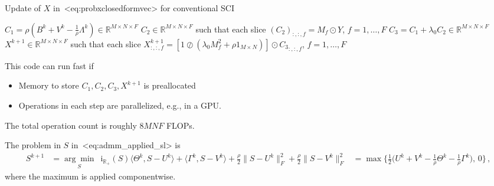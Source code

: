 \documentclass[a4paper,11pt]{article}
\def\\{}%
\def\eqref#1{<#1>}%
\newcommand{\mypar}[1]{\bigskip\noindent {\bf #1.}}
\begin{document}
\begin{algorithm}
  \caption{Update of $X$ in~\eqref{eq:probxclosedformvec} for
  conventional SCI}
  \label{alg:updateX}
  \begin{algorithmic}[1]
    \State $C_1 = \rho (B^k + V^k - \frac{1}{\rho}\Lambda^k) \in \mathbb{R}^{M\times N\times F}$
    \State $C_2 \in \mathbb{R}^{M\times N\times F}$ such that each slice
    $(C_2)_{:, :, f} = M_f \odot Y$, $f = 1, \ldots, F$
    \State $C_3 = C_1 + \lambda_0 C_2 \in \mathbb{R}^{M \times N\times F}$
    \State $X^{k+1} \in \mathbb{R}^{M\times N\times F}$ such that each slice
    $X^{k+1}_{:, :, f} = \left[1\oslash(\lambda_0 M_f^2 + \rho 1_{M\times N})\right]
    \odot {C_3}_{:, :, f}$,
    $f=1, \ldots, F$
    \label{subAlg:lastStep}
  \end{algorithmic}
\end{algorithm}
This code can run fast if
\begin{itemize}
  \item Memory to store $C_1, C_2, C_3, X^{k+1}$ is preallocated

  \item Operations in each step are parallelized, e.g., in a GPU.
\end{itemize}
The total operation count is roughly $8MNF$ FLOPs.

\mypar{Updating $\bm{S}$}
The problem in $S$ in~\eqref{eq:admm_applied_sl} is
\begin{align*}
  S^{k+1} 
  &=
  \underset{S}{\arg\min} \,\,\,
  \text{i}_{\mathbb{R}_+}(S)
  \langle\Theta^k, S - U^k\rangle
  +
  \langle\Gamma^k, S - V^k\rangle
  +
  \frac{\rho}{2}
  \|S - U^k\|_{F}^2
  +
  \frac{\rho}{2}
  \|S - V^k\|_{F}^2
  \\ 
  &=
  \max\bigg\{
  \frac{1}{2}
  \Big(U^k + V^k - \frac{1}{\rho}\Theta^k - \frac{1}{\rho}\Gamma^k\Big),\, 0
    \bigg\}
  \,,
\end{align*}
where the maximum is applied componentwise.
\end{document}
